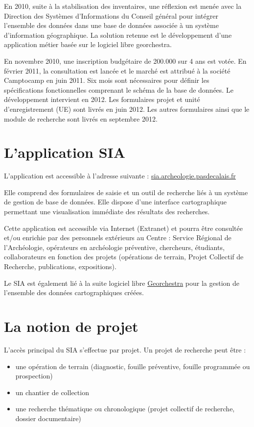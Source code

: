 \documentclass[letterpaper,10pt,french]{sphinxmanual}
\begin{document}
En 2010, suite à la stabilisation des inventaires, une réflexion est menée avec la Direction des Systèmes d’Informations du Conseil général pour intégrer l’ensemble des données dans une base de données associée à un système d’information géographique. La solution retenue est le développement d’une application métier basée sur le logiciel libre georchestra.

En novembre 2010, une inscription budgétaire de 200.000 \texteuro{} sur 4 ans est votée. En février 2011, la consultation est lancée et le marché est attribué à la société Camptocamp en juin 2011. Six mois sont nécessaires pour définir les spécifications fonctionnelles comprenant le schéma de la base de données. Le développement intervient en 2012. Les formulaires projet et unité d’enregistrement (UE) sont livrés en juin 2012. Les autres formulaires ainsi que le module de recherche sont livrés en septembre 2012.


\section{L’application SIA}
\label{manuel/intro:lapplication-sia}
L’application est accessible à l’adresse suivante : \href{https://sia.archeologie.pasdecalais.fr/}{sia.archeologie.pasdecalais.fr}

Elle comprend des formulaires de saisie et un outil de recherche liés à un système de gestion de base de données. Elle dispose d’une interface cartographique permettant une visualisation immédiate des résultats des recherches.

Cette application est accessible via Internet (Extranet) et pourra être consultée et/ou enrichie par des personnels extérieurs au Centre : Service Régional de l’Archéologie, opérateurs en archéologie préventive, chercheurs, étudiants, collaborateurs en fonction des projets (opérations de terrain, Projet Collectif de Recherche, publications, expositions).

Le SIA est également lié à la suite logiciel libre \href{http://www.georchestra.org/}{Georchestra} pour la gestion de l’ensemble des données cartographiques créées.


\section{La notion de projet}
\label{manuel/intro:la-notion-de-projet}\label{manuel/intro:def-projet}
L’accès principal du SIA s’effectue par projet. Un projet de recherche peut être :
\begin{itemize}
\item {} 
une opération de terrain (diagnostic, fouille préventive, fouille programmée ou prospection)

\item {} 
un chantier de collection

\item {} 
une recherche thématique ou chronologique (projet collectif de recherche, dossier documentaire)

\end{itemize}
\end{document}
